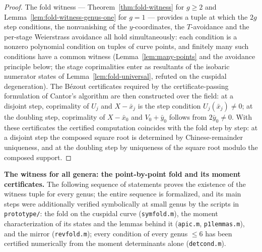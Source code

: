 \begin{proof}
\leanok
{}
The fold witness --- Theorem~\ref{thm:fold-witness} for $g \ge 2$ and
Lemma~\ref{lem:fold-witness-genus-one} for $g = 1$ --- provides a tuple at which the
$2g$ step conditions, the nonvanishing of the $y$-coordinates, the $T$-avoidance and the
per-stage Weierstrass avoidance all hold simultaneously: each condition is a nonzero
polynomial condition on tuples of curve points, and finitely many such conditions have a
common witness (Lemma~\ref{lem:many-points} and the avoidance principle below; the
stage coprimalities enter as resultants of the isobaric numerator states of
Lemma~\ref{lem:fold-universal}, refuted on the cuspidal degeneration). The B\'ezout
certificates required by the certificate-passing formulation of Cantor's algorithm are
then constructed over the field: at a disjoint step, coprimality of $U_j$ and
$X - \bar x_j$ is the step condition $U_j(\bar x_j) \neq 0$; at the doubling step,
coprimality of $X - \bar x_0$ and $V_0 + \bar y_0$ follows from $2\bar y_0 \neq 0$. With
these certificates the certified computation coincides with the fold step by step: at a
disjoint step the composed square root is determined by Chinese-remainder uniqueness,
and at the doubling step by uniqueness of the square root modulo the composed support.
\end{proof}

\bigskip
\noindent\textbf{The witness for all genera: the point-by-point fold and its moment
certificates.} The following sequence of statements proves the existence of the witness
tuple for every genus; the entire sequence is formalized, and its main steps were
additionally verified symbolically at small genus by the scripts in \texttt{prototype/}: the
fold on the cuspidal curve (\texttt{symfold.m}), the moment characterization of its states
and the lemmas behind it (\texttt{apic.m}, \texttt{p1lemmas.m}), and the mirror
(\texttt{revfold.m}); every condition of every genus $\le 6$ has been certified numerically
from the moment determinants alone (\texttt{detcond.m}).

